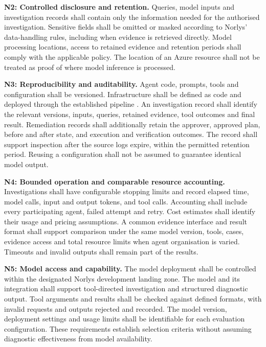 \noindent\textbf{N2: Controlled disclosure and retention.}
Queries, model inputs and investigation records shall contain only the
information needed for the authorised investigation. Sensitive fields shall
be omitted or masked according to Norlys' data-handling rules, including
when evidence is retrieved directly. Model processing locations, access
to retained evidence and retention periods shall comply with the
applicable policy. The location of an Azure resource shall not be treated
as proof of where model inference is processed.

\noindent\textbf{N3: Reproducibility and auditability.}
Agent code, prompts, tools and configuration shall be versioned.
Infrastructure shall be defined as code and deployed through the established
pipeline
\parencite[AC-1, AC-2]{norlys_operations_agents}. An investigation record
shall identify the relevant versions, inputs, queries, retained evidence,
tool outcomes and final result. Remediation records shall additionally
retain the approver, approved plan, before and after state, and execution
and verification outcomes. The record shall support inspection after the
source logs expire, within the permitted retention period. Reusing a
configuration shall not be assumed to guarantee identical model output.

\noindent\textbf{N4: Bounded operation and comparable resource accounting.}
Investigations shall have configurable stopping limits and record elapsed
time, model calls, input and output tokens, and tool calls. Accounting
shall include every participating agent, failed attempt and retry. Cost
estimates shall identify their usage and pricing assumptions. A common
evidence interface and result format shall support comparison under the
same model version, tools, cases, evidence access and total resource limits
when agent organisation is varied. Timeouts and invalid outputs shall
remain part of the results.

\noindent\textbf{N5: Model access and capability.}
The model deployment shall be controlled within the designated Norlys
development landing zone. The model and its integration shall support
tool-directed investigation and structured diagnostic output. Tool
arguments and results shall be checked against defined formats, with
invalid requests and outputs rejected and recorded. The model version,
deployment settings and usage limits shall be identifiable for each
evaluation configuration. These requirements establish selection criteria
without assuming diagnostic effectiveness from model availability.

